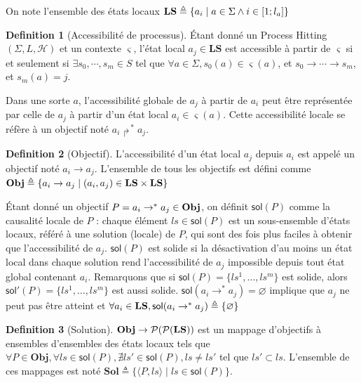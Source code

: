 \documentclass[11pt]{report}
\theoremstyle{definition}
\newtheorem{Def}{Definition}[chapter]
\begin{document}
On note l'ensemble des \'etats locaux ${\bf LS}\triangleq\{a_i\mid a\in\Sigma\land i\in[1;l_a]\}$

\begin{Def}[Accessibilit\'e de processus]
\'Etant donn\'e un Process Hitting $(\Sigma, L, \mathscr{H})$ et un contexte $\varsigma$, l'\'etat local $a_j\in\mathbf{LS}$ est accessible \`a partir de $\varsigma$ si et seulement si $\exists s_0,\cdots,s_m\in S$ tel que $\forall a\in\Sigma,s_0(a)\in\varsigma(a)$, et $s_0\to\cdots\to s _m$, et $s_m(a)=j$.
\end{Def}
Dans une sorte $a$, l'accessibilit\'e globale de $a_j$ \`a partir de $a_i$ peut \^etre repr\'esent\'ee par celle de $a_j$ \`a partir d'un \'etat local $a_i\in \varsigma(a)$. Cette accessibilit\'e locale se r\'ef\`ere \`a un objectif not\'e $a_i\Rsh^* a_j$.
\begin{Def}[Objectif]
L'accessibilit\'e d'un \'etat local $a_j$ depuis $a_i$ est appel\'e un objectif not\'e $a_i\to a_j$. L'ensemble de tous les objectifs est d\'efini comme ${\bf Obj}\triangleq\{a_i\to a_j \mid(a_i,a_j)\in {\bf LS\times LS}\}$
\end{Def}
\'Etant donn\'e un objectif $P=a_i\to^*a_j\in {\bf Obj}$, on d\'efinit $\mathsf{sol}(P)$ comme la causalit\'e locale de $P$ : chaque \'el\'ement $ls\in \mathsf{sol}(P)$ est un sous-ensemble d'\'etats locaux, r\'ef\'er\'e \`a une solution (locale) de $P$, qui sont des fois plus faciles \`a obtenir que l'accessibilit\'e de $a_j$. $\mathsf{sol}(P)$ est solide si la d\'esactivation d'au moins un \'etat local dans chaque solution rend l'accessibilit\'e de $a_j$ impossible depuis tout \'etat global contenant $a_i$. Remarquons que si $\mathsf{sol}(P)=\{ls^1,\ldots,ls^m\}$ est solide, alors $\mathsf{sol}'(P)=\{ls^1,\ldots,ls^m\}$ est aussi solide. $\mathsf{sol}(a_i\to^*a_j)=\varnothing$ implique que $a_j$ ne peut pas \^etre atteint et $\forall a_i\in {\bf LS}, \mathsf{sol}(a_i\to^*a_j)\triangleq\{\varnothing\}$
\begin{Def}[Solution]
${\bf Obj}\to\mathcal{P}(\mathcal{P}(\mathbf{LS}))$ est un mappage d'objectifs \`a ensembles d'ensembles des \'etats locaux tels que $\forall P\in \mathbf{Obj},\forall ls \in \mathsf{sol}(P), \nexists ls'\in \mathsf{sol}(P), ls\neq ls'$ tel que $ls'\subset ls$. L'ensemble de ces mappages est not\'e $\mathbf{Sol}\triangleq\{\langle P,ls\rangle\mid ls\in \mathsf{sol}(P)\}$.
\end{Def}
\end{document}
